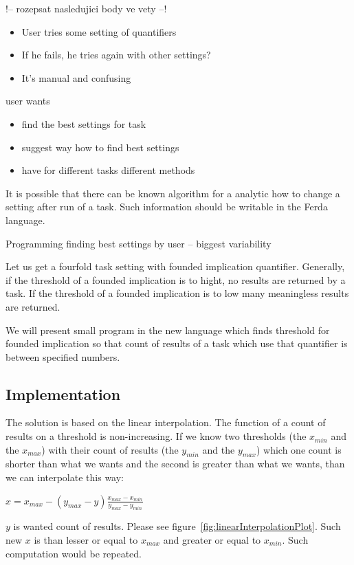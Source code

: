 \documentclass[a4paper,12pt]{book}
\begin{document}
!-- rozepsat nasledujici body ve vety --!

\begin{itemize}
			\item User tries some setting of quantifiers
			\item If he fails, he tries again with other settings?
			\item It's manual and confusing
\end{itemize}
		user wants
		\begin{itemize}
			\item find the best settings for task
			\item suggest way how to find best settings
			\item have for different tasks different methods
		\end{itemize}

It is possible that there can be known algorithm for a analytic how to change a setting after run of a task. Such information should be writable in the Ferda language.

Programming finding best settings by user -- biggest variability

Let us get a fourfold task setting with founded implication quantifier. Generally, if the threshold of a founded implication is to hight, no results are returned by a task. If the threshold of a founded implication is to low many meaningless results are returned.

We will present small program in the new language which finds threshold for founded implication so that count of results of a task which use that quantifier is between specified numbers.

\subsection{Implementation}
The solution is based on the linear interpolation. The function of a count of results on a threshold is non-increasing. If we know two thresholds (the $x_{min}$ and the $x_{max}$) with their count of results (the $y_{min}$ and the $y_{max}$) which one count is shorter than what we wants and the second is greater than what we wants, than we can interpolate this way: 

\begin{math}
x = x_{max} - (y_{max} - y)\frac{x_{max} - x_{min}}{y_{max} - y_{min}}
\end{math}

$y$ is wanted count of results. Please see figure~\ref{fig:linearInterpolationPlot}. Such new $x$ is than lesser or equal to $x_{max}$ and greater or equal to $x_{min}$. Such computation would be repeated.
\end{document}
